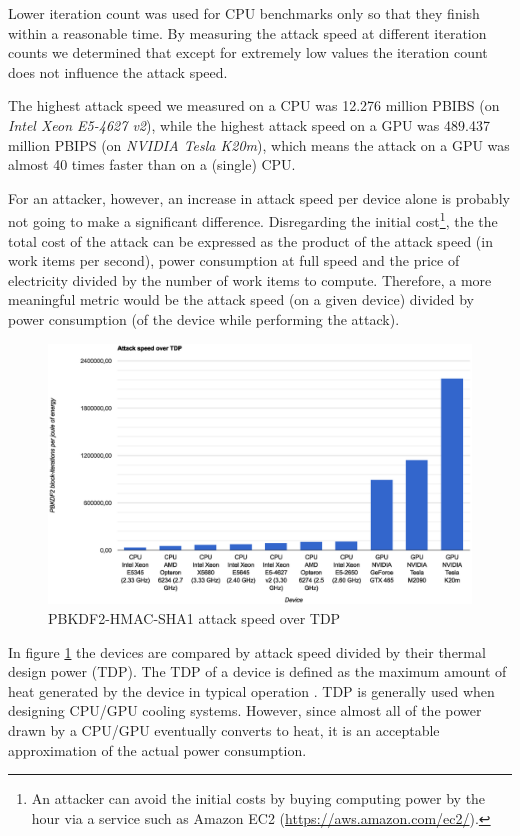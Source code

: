 \documentclass[12pt,oneside]{fithesis2}
\begin{document}
      Lower iteration count was used for CPU benchmarks only so that they finish within a reasonable time. By measuring the attack speed at different iteration counts we determined that except for extremely low values the iteration count does not influence the attack speed.
      
      The highest attack speed we measured on a CPU was 12.276 million PBIBS (on \emph{Intel Xeon E5-4627 v2}), while the highest attack speed on a GPU was 489.437 million PBIPS (on \emph{NVIDIA Tesla K20m}), which means the attack on a GPU was almost 40 times faster than on a (single) CPU.
      
      For an attacker, however, an increase in attack speed per device alone is probably not going to make a significant difference. Disregarding the initial cost\footnote{An attacker can avoid the initial costs by buying computing power by the hour via a service such as Amazon EC2 (\url{https://aws.amazon.com/ec2/}).}, the the total cost of the attack can be expressed as the product of the attack speed (in work items per second), power consumption at full speed and the price of electricity divided by the number of work items to compute. Therefore, a more meaningful metric would be the attack speed (on a given device) divided by power consumption (of the device while performing the attack).
      
      \begin{figure}
        \centering
        \includegraphics[width=\linewidth, clip=true, trim=1.5cm 0cm 2cm 3cm]{images/devices-power-consumption.eps}
        \caption{PBKDF2-HMAC-SHA1 attack speed over TDP}
        \label{graph:devices:power}
      \end{figure}
      
      In figure \ref{graph:devices:power} the devices are compared by attack speed divided by their thermal design power (TDP). The TDP of a device is defined as the maximum amount of heat generated by the device in typical operation \cite{tdp}. TDP is generally used when designing CPU/GPU cooling systems. However, since almost all of the power drawn by a CPU/GPU eventually converts to heat, it is an acceptable approximation of the actual power consumption.
      
\end{document}

